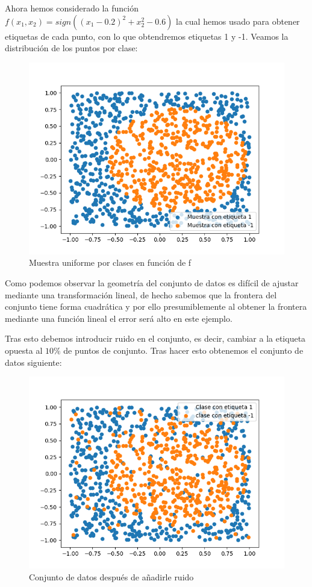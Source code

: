 \documentclass[12pt,a4paper]{article}
\begin{document}
Ahora hemos considerado la función $f(x_1,x_2) = sign((x_1-0.2)^2 + x_{2}^{2}-0.6)$ la cual hemos usado para obtener etiquetas de cada punto, con lo que obtendremos etiquetas 1 y -1. Veamos la distribución de los puntos por clase:

\begin{figure}[H]
	\centering
	\includegraphics[scale=0.8]{./Imagenes/ej2-2-3.png}
	\caption{Muestra uniforme por clases en función de f}
	\label{ej2-2-3}
\end{figure}

Como podemos observar la geometría del conjunto de datos es difícil de ajustar mediante una transformación lineal, de hecho sabemos que la frontera del conjunto tiene forma cuadrática y por ello presumiblemente al obtener la frontera mediante una función lineal el error será alto en este ejemplo.

Tras esto debemos introducir ruido en el conjunto, es decir, cambiar a la etiqueta opuesta al $10\%$ de puntos de conjunto. Tras hacer esto obtenemos el conjunto de datos siguiente:

\begin{figure}[H]
	\centering
	\includegraphics[scale=0.8]{./Imagenes/ej2-2-2.png}
	\caption{Conjunto de datos después de añadirle ruido}
	\label{ej2-2-2}
\end{figure}
\end{document}
